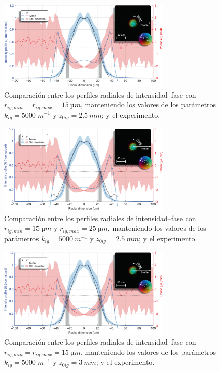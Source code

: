 \begin{figure}[htbp]
  \centering
  \includegraphics[width=0.74\textwidth]{Figuras/anx_cmp_63.png}
  \caption*{Comparación entre los perfiles radiales de intensidad--fase con $r_{ig,min}=r_{ig,max}=\qty{15}{µm}$, manteniendo los valores de los parámetros $k_{ig}=\qty{5000}{m^{-1}}$ y $z_{0ig}=\qty{2.5}{mm}$; y el experimento.}
\end{figure}

\begin{figure}[htbp]
  \centering
  \includegraphics[width=0.74\textwidth]{Figuras/anx_cmp_64.png}
  \caption*{Comparación entre los perfiles radiales de intensidad--fase con $r_{ig,min}=\qty{15}{µm}$ y $r_{ig,max}=\qty{25}{µm}$, manteniendo los valores de los parámetros $k_{ig}=\qty{5000}{m^{-1}}$ y $z_{0ig}=\qty{2.5}{mm}$; y el experimento.}
\end{figure}

\begin{figure}[htbp]
  \centering
  \includegraphics[width=0.74\textwidth]{Figuras/anx_cmp_65.png}
  \caption*{Comparación entre los perfiles radiales de intensidad--fase con $r_{ig,min}=r_{ig,max}=\qty{15}{µm}$, manteniendo los valores de los parámetros $k_{ig}=\qty{5000}{m^{-1}}$ y $z_{0ig}=\qty{3}{mm}$; y el experimento.}
\end{figure}

